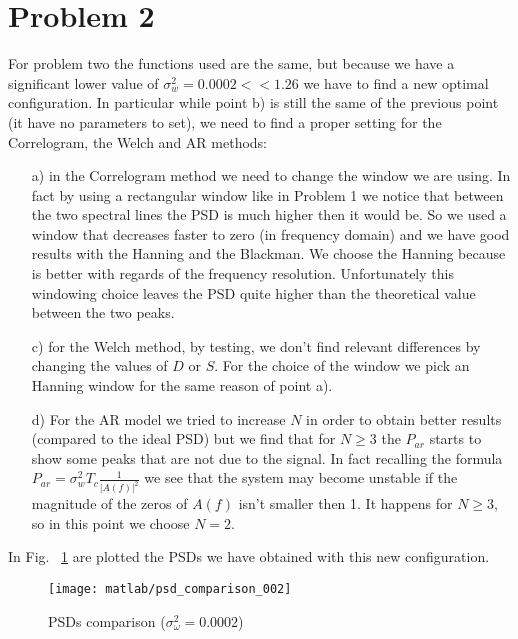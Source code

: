 \documentclass{article}
\begin{document}
\section*{Problem 2}
For problem two the functions used are the same, but because we have a significant lower value of $\sigma_w^2 = 0.0002 << 1.26$ we have to find a new optimal configuration. In particular while point b) is still the same of the previous point (it have no parameters to set), we need to find a proper setting for the Correlogram, the Welch and AR methods:
\begin{itemize}
 \item[a)] in the Correlogram method we need to change the window we are using. In fact by using a rectangular window like in Problem 1 we notice that between the two spectral lines the PSD is much higher then it would be. So we used a window that decreases faster to zero (in frequency domain) and we have good results with the Hanning and the Blackman. We choose the Hanning because is better with regards of the frequency resolution. Unfortunately this windowing choice leaves the PSD quite higher than the theoretical value between the two peaks.
 \item[c)] for the Welch method, by testing, we don't find relevant differences by changing the values of $D$ or $S$. For the choice of the window we pick an Hanning window for the same reason of point a).
 \item[d)] For the AR model we tried to increase $N$ in order to obtain better results (compared to the ideal PSD) but we find that for $N\geq 3$ the $P_{ar}$ starts to show some peaks that are not due to the signal. In fact recalling the formula $P_{ar} = \sigma_w^2 T_c \frac{1}{|A(f)|^2}$ we see that the system may become unstable if the magnitude of the zeros of $A(f)$ isn't smaller then 1. It happens for $N\geq3$, so in this point we choose $N=2$. 
\end{itemize}
In Fig. ~\ref{plot:psd_comparison_002} are plotted the PSDs we have obtained with this new configuration.
\begin{figure}[htbp]
  \centering
  \texttt{[image: matlab/psd\_comparison\_002]}
  \caption{PSDs comparison ($\sigma_\omega^2 = 0.0002$)}
  \label{plot:psd_comparison_002}
\end{figure}
\end{document}
